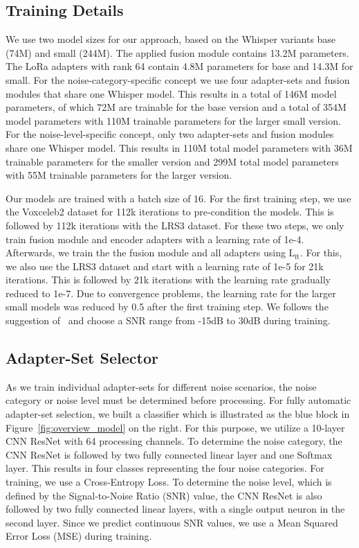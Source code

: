 \subsection{Training Details}

We use two model sizes for our approach, based on the Whisper variants base (74M) and small (244M). The applied fusion module contains 13.2M parameters. The LoRa adapters with rank 64 contain 4.8M parameters for base and 14.3M for small. For the noise-category-specific concept we use four adapter-sets and fusion modules that share one Whisper model. This results in a total of 146M model parameters, of which 72M are trainable for the base version and a total of 354M model parameters with 110M trainable parameters for the larger small version. For the noise-level-specific concept, only two adapter-sets and fusion modules share one Whisper model. This results in 110M total model parameters with 36M trainable parameters for the smaller version and 299M total model parameters with 55M trainable parameters for the larger version.

Our models are trained with a batch size of 16. For the first training step, we use the Voxceleb2 dataset for 112k iterations to pre-condition the models. This is followed by 112k iterations with the LRS3 dataset. For these two steps, we only train fusion module and encoder adapters with a learning rate of 1e-4. Afterwards, we train the the fusion module and all adapters using $\text{L}_{\text{ft}}$. For this, we also use the LRS3 dataset and start with a learning rate of 1e-5 for 21k iterations. This is followed by 21k iterations with the learning rate gradually reduced to 1e-7. Due to convergence problems, the learning rate for the larger small models was reduced by 0.5 after the first training step.
We follows the suggestion of~\cite{AVSR_2023_selfsupervised} and choose a SNR range from -15dB to 30dB during training.


\subsection{Adapter-Set Selector}

As we train individual adapter-sets for different noise scenarios, the noise category or noise level must be determined before processing. For fully automatic adapter-set selection, we built a classifier which is illustrated as the blue block in Figure~\ref{fig:overview_model} on the right. 
For this purpose, we utilize a 10-layer CNN ResNet with 64 processing channels. To determine the noise category, the CNN ResNet is followed by two fully connected linear layer and one Softmax layer. This results in four classes representing the four noise categories. For training, we use a Cross-Entropy Loss.
To determine the noise level, which is defined by the Signal-to-Noise Ratio (SNR) value, the CNN ResNet is also followed by two fully connected linear layers, with a single output neuron in the second layer. Since we predict continuous SNR values, we use a Mean Squared Error Loss (MSE) during training.
